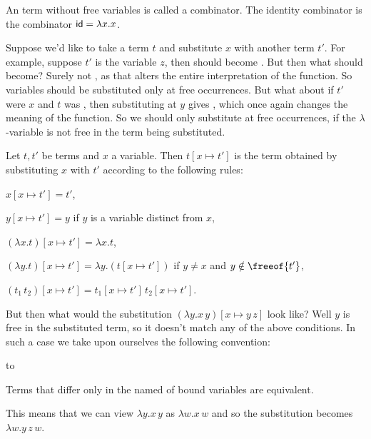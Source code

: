 \bdefn

    An term without free variables is called a {\emphcolor combinator}.
    The {\emphcolor identity combinator} is the combinator ${\sf id}=\lambda x.x$.

\edefn

Suppose we'd like to take a term $t$ and substitute $x$ with another term $t'$.
For example, suppose $t'$ is the variable $z$, then  should become .
But then what should  become?
Surely not , as that alters the entire interpretation of the function.
So variables should be substituted only at free occurrences.
But what about if $t'$ were $x$ and $t$ was , then substituting at $y$ gives , which once again changes the meaning of the function.
So we should only substitute at free occurrences, if the $\lambda$-variable is not free in the term being substituted.

\bdefn

    Let $t,t'$ be terms and $x$ a variable.
    Then $t[x\mapsto t']$ is the term obtained by substituting $x$ with $t'$ according to the following rules:
    \benum
        \item $x[x\mapsto t']=t'$,
        \item $y[x\mapsto t']=y$ if $y$ is a variable distinct from $x$,
        \item $(\lambda x.t)[x\mapsto t']=\lambda x.t$,
        \item $(\lambda y.t)[x\mapsto t']=\lambda y.(t[x\mapsto t'])$ if $y\neq x$ and $y\notin\freeof{t'}$,
        \item $(t_1\,t_2)[x\mapsto t']=t_1[x\mapsto t']\,t_2[x\mapsto t']$.
    \eenum

\edefn

But then what would the substitution $(\lambda y.x\,y)[x\mapsto y\,z]$ look like?
Well $y$ is free in the substituted term, so it doesn't match any of the above conditions.
In such a case we take upon ourselves the following convention:

\hbox to
\medskip

    Terms that differ only in the named of bound variables are equivalent.

\eppbox

This means that we can view $\lambda y.x\,y$ as $\lambda w.x\,w$ and so the substitution becomes $\lambda w.y\,z\,w$.

